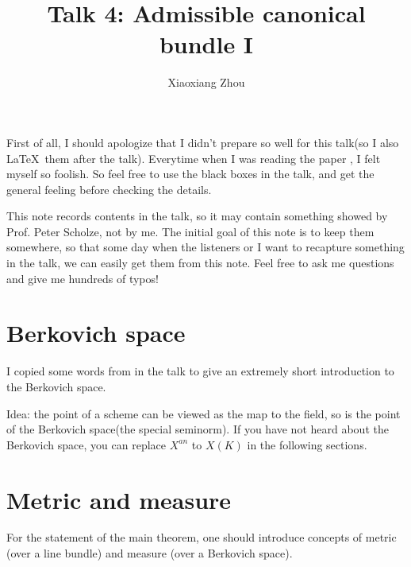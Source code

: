 \documentclass[reqno,11pt]{amsart}
\numberwithin{equation}{section}
\theoremstyle{plain}
\theoremstyle{plain}
\numberwithin{equation}{section}
\theoremstyle{remark}
\begin{document}
\date{}

\title
{Talk 4: Admissible canonical bundle I
}


\author{Xiaoxiang Zhou}
\address{School of Mathematical Sciences\\
University of Bonn\\
Bonn, 53115\\ Germany\\} 



\setcounter{tocdepth}{1}
\maketitle
\tableofcontents

First of all, I should apologize that I didn't prepare so well for this talk(so I also \LaTeX$\,$ them after the talk). Everytime when I was reading the paper \cite{yuan2021arithmetic}, I felt myself so foolish. So feel free to use the black boxes in the talk, and get the general feeling before checking the details.

This note records contents in the talk, so it may contain something showed by Prof. Peter Scholze, not by me. The initial goal of this note is to keep them somewhere, so that some day when the listeners or I want to recapture something in the talk, we can easily get them from this note. Feel free to ask me questions and give me hundreds of typos!

\section{Berkovich space}

I copied some words from \cite[3.1.1]{yuan2021adelic} in the talk to give an extremely short introduction to the Berkovich space. 

Idea: the point of a scheme can be viewed as the map to the field, so is the point of the Berkovich space(the special seminorm). If you have not heard about the Berkovich space, you can replace $X^{an}$ to $X(K)$ in the following sections.

\section{Metric and measure}
For the statement of the main theorem, one should introduce concepts of metric (over a line bundle) and measure (over a Berkovich space).
\end{document}
